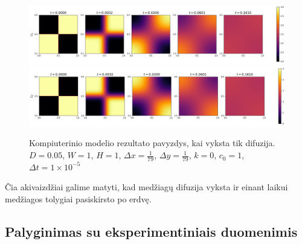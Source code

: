 \begin{figure}[h!]
\centering
\includegraphics[width=\textwidth]{../assets/only-diffusion-c1.png} \\
\includegraphics[width=\textwidth]{../assets/only-diffusion-c2.png}
\caption{Kompiuterinio modelio rezultato pavyzdys, kai vyksta tik difuzija. $D = 0.05$, $W = 1$, $H = 1$, $\Delta x = \frac{1}{79}$, $\Delta y = \frac{1}{79}$, $k = 0$, $c_0 = 1$, $\Delta t = 1\times 10^{-5}$ }
\label{result-example}
\end{figure}

Čia akivaizdžiai galime matyti, kad medžiagų difuzija vyksta ir einant laikui medžiagos tolygiai pasiskirsto po erdvę.

\subsection{Palyginimas su eksperimentiniais duomenimis}
